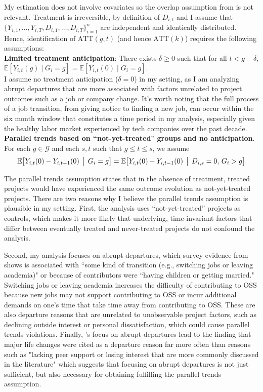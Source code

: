 \documentclass[12pt,notitlepage]{article}
\begin{document}
My estimation does not involve covariates so the overlap assumption from \cite{callaway_difference--differences_2021} is not relevant. Treatment is irreversible, by definition of $D_{i,t}$ and I assume that $\{Y_{i,1},\dots,Y_{i,T},D_{i,1},\dots,D_{i,T}\}_{i=1}^n$ are independent and identically distributed. Hence, identification of $\mathrm{ATT}(g,t)$ (and hence $\mathrm{ATT}(k)$) requires the following assumptions:\\
\textbf{Limited treatment anticipation}: There exists $\delta\ge0$ such that for all $t<g-\delta$, $\mathbb{E}[Y_{i,t}(g)\mid G_i=g] = \mathbb{E}[Y_{i,t}(0)\mid G_i=g].$\\
I assume no treatment anticipation ($\delta=0$) in my setting, as I am analyzing abrupt departures that are more associated with factors unrelated to project outcomes such as a job or company change. It's worth noting that the full process of a job transition, from giving notice to finding a new job, can occur within the six month window that constitutes a time period in my analysis, especially given the healthy labor market experienced by tech companies over the past decade.\\
\textbf{Parallel trends based on ``not-yet-treated" groups and no anticipation}. For each $g\in\mathcal{G}$ and each $s, t$ such that $g \leq t \leq s$, we assume \[\mathbb{E}\bigl[Y_{i,t}(0)-Y_{i,t-1}(0)\,\bigm|\,G_i = g\bigr] =  \mathbb{E}\bigl[Y_{i,t}(0)-Y_{i,t-1}(0)\,\bigm|\,D_{i,s}=0,\,G_i > g\bigr]\]

The parallel trends assumption states that in the absence of treatment, treated projects would have experienced the same outcome evolution as not-yet-treated projects. 
There are two reasons why I believe the parallel trends assumption is plausible in my setting. First, the analysis uses ``not-yet-treated'' projects as controls, which makes it more likely that underlying, time-invariant factors that differ between eventually treated and never-treated projects do not confound the analysis. 

Second, my analysis focuses on abrupt departures, which survey evidence from \cite{miller_why_2019} shows is associated with ``some kind of transition (e.g., switching jobs or leaving academia)" or because of contributors were ``having children or getting married." Switching jobs or leaving academia increases the difficulty of contributing to OSS because new jobs may not support contributing to OSS or incur additional demands on one's time that take time away from contributing to OSS. These are also departure reasons that are unrelated to unobservable project factors, such as declining outside interest or personal dissatisfaction, which could cause parallel trends violations. Finally, \cite{miller_why_2019}'s focus on abrupt departures lead to the finding that major life changes were cited as a departure reason far more often than reasons such as "lacking peer support or losing interest that are more commonly discussed in the literature" which suggests that focusing on abrupt departures is not just sufficient, but also necessary for obtaining fulfilling the parallel trends assumption. 
\end{document}
